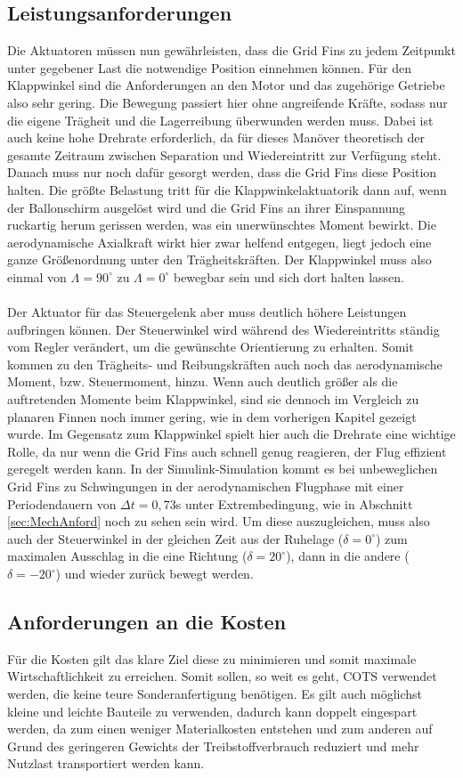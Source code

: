 \subsection{Leistungsanforderungen}
Die Aktuatoren müssen nun gewährleisten, dass die Grid Fins zu jedem Zeitpunkt unter gegebener Last die notwendige Position einnehmen können. Für den Klappwinkel sind die Anforderungen an den Motor und das zugehörige Getriebe also sehr gering. Die Bewegung passiert hier ohne angreifende Kräfte, sodass nur die eigene Trägheit und die Lagerreibung überwunden werden muss. Dabei ist auch keine hohe Drehrate erforderlich, da für dieses Manöver theoretisch der gesamte Zeitraum zwischen Separation und Wiedereintritt zur Verfügung steht. Danach muss nur noch dafür gesorgt werden, dass die Grid Fins diese Position halten. Die größte Belastung tritt für die Klappwinkelaktuatorik dann auf, wenn der Ballonschirm ausgelöst wird und die Grid Fins an ihrer Einspannung ruckartig herum gerissen werden, was ein unerwünschtes Moment bewirkt. Die aerodynamische Axialkraft wirkt hier zwar helfend entgegen, liegt jedoch eine ganze Größenordnung unter den Trägheitskräften.
Der Klappwinkel muss also einmal von $\Lambda=90^\circ$ zu $\Lambda=0^\circ$ bewegbar sein und sich dort halten lassen.
\\~\\
Der Aktuator für das Steuergelenk aber muss deutlich höhere Leistungen aufbringen können. Der Steuerwinkel wird während des Wiedereintritts ständig vom Regler verändert, um die gewünschte Orientierung zu erhalten. Somit kommen zu den Trägheits- und Reibungskräften auch noch das aerodynamische Moment, bzw. Steuermoment, hinzu. Wenn auch deutlich größer als die auftretenden Momente beim Klappwinkel, sind sie dennoch im Vergleich zu planaren Finnen noch immer gering, wie in dem vorherigen Kapitel gezeigt wurde. Im Gegensatz zum Klappwinkel spielt hier auch die Drehrate eine wichtige Rolle, da nur wenn die Grid Fins auch schnell genug reagieren, der Flug effizient geregelt werden kann. In der Simulink-Simulation kommt es bei unbeweglichen Grid Fins zu Schwingungen in der aerodynamischen Flugphase mit einer Periodendauern von $\Delta t=0,73$s unter Extrembedingung, wie in Abschnitt \ref{sec:MechAnford} noch zu sehen sein wird. Um diese auszugleichen, muss also auch der Steuerwinkel in der gleichen Zeit aus der Ruhelage ($\delta = 0^\circ$) zum maximalen Ausschlag in die eine Richtung ($\delta = 20^\circ$), dann in die andere ($\delta = -20^\circ$) und wieder zurück bewegt werden.
\subsection{Anforderungen an die Kosten}
Für die Kosten gilt das klare Ziel diese zu minimieren und somit maximale Wirtschaftlichkeit zu erreichen. Somit sollen, so weit es geht, COTS verwendet werden, die keine teure Sonderanfertigung benötigen. Es gilt auch möglichst kleine und leichte Bauteile zu verwenden, dadurch kann doppelt eingespart werden, da zum einen weniger Materialkosten entstehen und zum anderen auf Grund des geringeren Gewichts der Treibstoffverbrauch reduziert und mehr Nutzlast transportiert werden kann.
